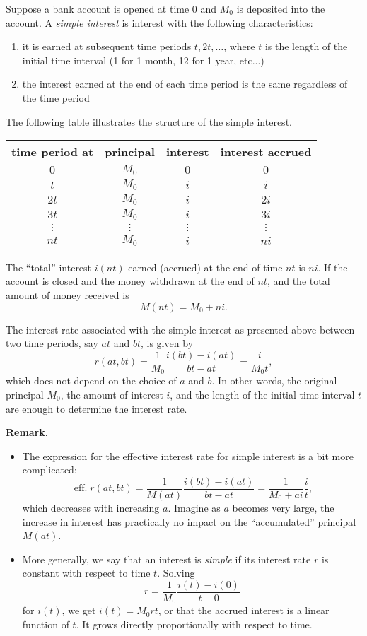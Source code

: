 \documentclass[12pt]{article}
\begin{document}
Suppose a bank account is opened at time $0$ and $M_0$ is deposited into the account.  A \emph{simple interest} is interest with the following characteristics:
\begin{enumerate}
\item it is earned at subsequent time periods $t,2t,\ldots$, where $t$ is the length of the initial time interval (1 for 1 month, 12 for 1 year, etc...)
\item the interest earned at the end of each time period is the same regardless of the time period
\end{enumerate}
The following table illustrates the structure of the simple interest.

\begin{center}
\begin{tabular}{|c||c|c|c|}
\hline  time period at & principal & interest & interest accrued \\
\hline\hline $0$ & $M_0$ & $0$ & $0$ \\
\hline $t$ & $M_0$ & $i$ & $i$ \\
\hline $2t$ & $M_0$ & $i$ & $2i$ \\
\hline $3t$ & $M_0$ & $i$ & $3i$ \\
\hline $\vdots$ & $\vdots$ & $\vdots$ & $\vdots$ \\
\hline $nt$ & $M_0$ & $i$ & $ni$ \\
\hline
\end{tabular}
\end{center}

The ``total'' interest $i(nt)$ earned (accrued) at the end of time $nt$ is $ni$.  If the account is closed and the money withdrawn at the end of $nt$, and the total amount of money received is $$M(nt)=M_0+ni.$$

The interest rate associated with the simple interest as presented above between two time periods, say $at$ and $bt$, is given by
$$r(at,bt)=\frac{1}{M_0}\frac{i(bt)-i(at)}{bt-at}=\frac{i}{M_0t},$$
which does not depend on the choice of $a$ and $b$.  In other words, the original principal $M_0$, the amount of interest $i$, and the length of the initial time interval $t$ are enough to determine the interest rate.

\textbf{Remark}.  
\begin{itemize}
\item
The expression for the effective interest rate for simple interest is a bit more complicated:
$$\operatorname{eff.}r(at,bt)=\frac{1}{M(at)}\frac{i(bt)-i(at)}{bt-at}=
\frac{1}{M_0+ai}\frac{i}{t},$$
which decreases with increasing $a$.  Imagine as $a$ becomes very large, the increase in interest has practically no impact on the ``accumulated'' principal $M(at)$.
\item
More generally, we say that an interest is \emph{simple} if its interest rate $r$ is constant with respect to time $t$.  Solving
$$r=\frac{1}{M_0}\frac{i(t)-i(0)}{t-0}$$
for $i(t)$, we get $i(t)=M_0rt$, or that the accrued interest is a linear function of $t$.  It grows directly proportionally with respect to time.
\end{itemize}
\end{document}
